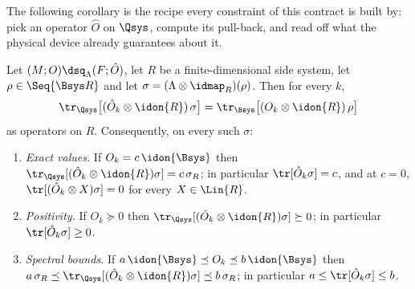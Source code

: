 
The following corollary is the recipe every constraint of this contract is
built by: pick an operator $\hat O$ on $\Qsys$, compute its pull-back, and
read off what the physical device already guarantees about it.

\begin{corollary}\label{cor:pullback}
Let $(M;O)\dsq_{\Lambda}(F;\hat O)$, let $R$ be a finite-dimensional side
system, let $\rho\in\Seq{\Bsys R}$ and let
$\sigma=(\Lambda\otimes\idmap_R)(\rho)$. Then for every $k$,
\begin{equation}\label{eq:transport}
  \tr_{\Qsys}\big[(\hat O_k\otimes\idon{R})\,\sigma\big]
  =\tr_{\Bsys}\big[(O_k\otimes\idon{R})\,\rho\big]
\end{equation}
as operators on $R$. Consequently, on every such $\sigma$:
\begin{enumerate}[label=(\roman*),leftmargin=3.0em]
\item \emph{Exact values.} If $O_k=c\,\idon{\Bsys}$ then
  $\tr_{\Qsys}[(\hat O_k\otimes\idon{R})\sigma]=c\,\sigma_R$; in particular
  $\tr[\hat O_k\sigma]=c$, and at $c=0$,
  $\tr[(\hat O_k\otimes X)\sigma]=0$ for every $X\in\Lin{R}$.
\item \emph{Positivity.} If $O_k\succeq0$ then
  $\tr_{\Qsys}[(\hat O_k\otimes\idon{R})\sigma]\succeq0$; in particular
  $\tr[\hat O_k\sigma]\ge0$.
\item \emph{Spectral bounds.} If
  $a\,\idon{\Bsys}\preceq O_k\preceq b\,\idon{\Bsys}$ then
  $a\,\sigma_R\preceq\tr_{\Qsys}[(\hat O_k\otimes\idon{R})\sigma]
  \preceq b\,\sigma_R$; in particular
  $a\le\tr[\hat O_k\sigma]\le b$.
\end{enumerate}
\end{corollary}

